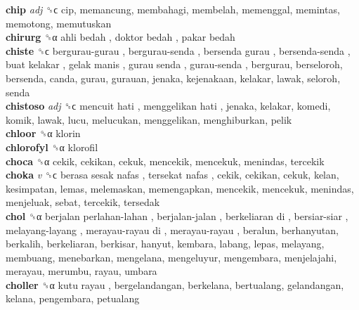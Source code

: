 \textbf{chip} \emph{adj}  ␝ϲ  cip, memancung, membahagi, membelah, memenggal, memintas, memotong, memutuskan  \\
\textbf{chirurg} ␝α   ahli bedah ,  doktor bedah ,  pakar bedah   \\
\textbf{chiste} ␝ϲ   bergurau-gurau ,  bergurau-senda ,  bersenda gurau ,  bersenda-senda ,  buat kelakar ,  gelak manis ,  gurau senda ,  gurau-senda , bergurau, berseloroh, bersenda, canda, gurau, gurauan, jenaka, kejenakaan, kelakar, lawak, seloroh, senda  \\
\textbf{chistoso} \emph{adj}  ␝ϲ   mencuit hati ,  menggelikan hati , jenaka, kelakar, komedi, komik, lawak, lucu, melucukan, menggelikan, menghiburkan, pelik  \\
\textbf{chloor} ␝α  klorin  \\
\textbf{chlorofyl} ␝α  klorofil  \\
\textbf{choca} ␝α  cekik, cekikan, cekuk, mencekik, mencekuk, menindas, tercekik  \\
\textbf{choka} \emph{v}  ␝ϲ   berasa sesak nafas ,  tersekat nafas , cekik, cekikan, cekuk, kelan, kesimpatan, lemas, melemaskan, memengapkan, mencekik, mencekuk, menindas, menjeluak, sebat, tercekik, tersedak  \\
\textbf{chol} ␝α   berjalan perlahan-lahan ,  berjalan-jalan ,  berkeliaran di ,  bersiar-siar ,  melayang-layang ,  merayau-rayau di ,  merayau-rayau , beralun, berhanyutan, berkalih, berkeliaran, berkisar, hanyut, kembara, labang, lepas, melayang, membuang, menebarkan, mengelana, mengeluyur, mengembara, menjelajahi, merayau, merumbu, rayau, umbara  \\
\textbf{choller} ␝α   kutu rayau , bergelandangan, berkelana, bertualang, gelandangan, kelana, pengembara, petualang  \\
